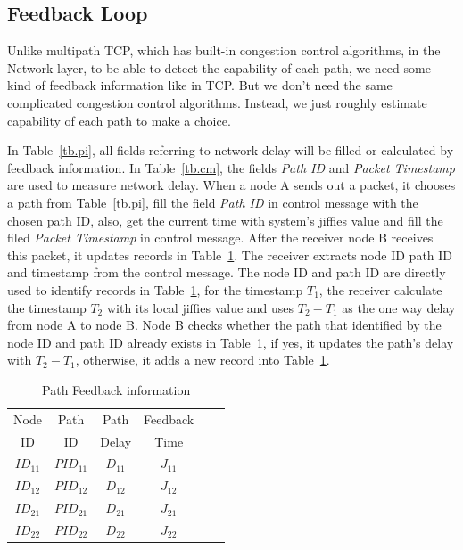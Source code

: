 \subsection{Feedback Loop}

Unlike multipath TCP, which has built-in congestion control algorithms, in the Network layer, to be able to detect the capability of each path, we need some kind of feedback information like in TCP. But we don't need the same complicated congestion control algorithms. Instead, we just roughly estimate capability of each path to make a choice.

In Table~\ref{tb.pi}, all fields referring to network delay will be filled or calculated by feedback information. In Table~\ref{tb.cm}, the fields \emph{Path ID} and \emph{Packet Timestamp} are used to measure network delay. When a node A sends out a packet, it chooses a path from Table~\ref{tb.pi}, fill the field \emph{Path ID} in control message with the chosen path ID, also, get the current time with system's jiffies value and fill the filed \emph{Packet Timestamp} in control message. After the receiver node B receives this packet, it updates records in Table~\ref{tb.ps}. The receiver extracts node ID path ID and timestamp from the control message. The node ID and path ID are directly used to identify records in Table~\ref{tb.ps}, for the timestamp $T_1$, the receiver calculate the timestamp $T_2$ with its local jiffies value and uses $T_2-T_1$ as the one way delay from node A to node B. Node B checks whether the path that identified by the node ID and path ID already exists in Table~\ref{tb.ps}, if yes, it updates the path's delay with $T_2-T_1$, otherwise, it adds a new record into Table~\ref{tb.ps}.

\begin{table}[htbp]
\caption{\label{tb.ps}Path Feedback information}
\centering
\begin{tabular}{|c|c|c|c|c|c|}
\hline
 Node   & Path    & Path      & Feedback           \\
  ID    &  ID     & Delay     & Time               \\
\hline
${ID}_{11}$&${PID}_{11}$&${D}_{11}$&${J}_{11}$   \\
\hline
${ID}_{12}$&${PID}_{12}$&${D}_{12}$&${J}_{12}$   \\
\hline
${ID}_{21}$&${PID}_{21}$&${D}_{21}$&${J}_{21}$   \\
\hline
${ID}_{22}$&${PID}_{22}$&${D}_{22}$&${J}_{22}$   \\
\hline
\end{tabular}
\end{table}

